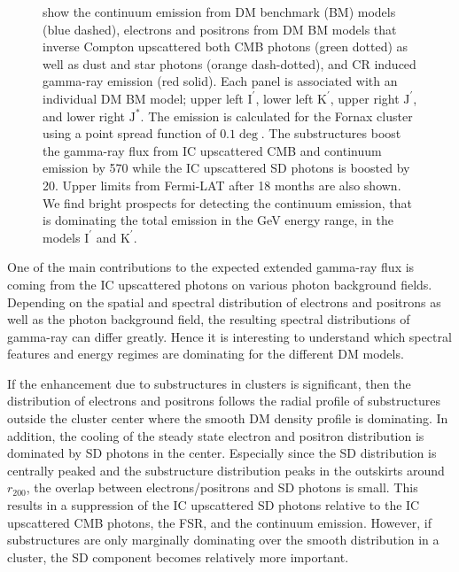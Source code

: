 \documentclass[10pt,aps,pra,reprint,amsmath,amsfonts,amssymb,showpacs,nofootinbib,floatfix]{revtex4-1}
\newcommand{\rmn}{\mathrm}
\newcommand{\Kp}{\rmn{K}^\prime}
\newcommand{\Ip}{\rmn{I}^\prime}
\newcommand{\Js}{\rmn{J}^*}
\newcommand{\Jp}{\rmn{J}^\prime}
\newcommand{\rvir}{r_{200}}
\begin{document}
\begin{figure}
\begin{minipage}{2.0\columnwidth}
{  show the continuum emission from DM benchmark (BM) models (blue
  dashed), electrons and positrons from DM BM models that inverse
  Compton upscattered both CMB photons (green dotted) as well as dust
  and star photons (orange dash-dotted), and CR induced gamma-ray
  emission (red solid). Each panel is associated with an individual DM
  BM model; upper left $\Ip$, lower left $\Kp$, upper right $\Jp$, and
  lower right $\Js$. The emission is calculated for the Fornax cluster
  using a point spread function of $0.1\deg$. The substructures boost
  the gamma-ray flux from IC upscattered CMB and continuum emission by
  570 while the IC upscattered SD photons is boosted by 20. Upper limits
from Fermi-LAT after 18 months 
 \protect \cite{2010ApJ...717L..71A} are also shown. We find
  bright prospects for detecting the continuum emission, that is
  dominating the total emission in the GeV energy range, in the models
  $\Ip$ and $\Kp$.}
 \label{fig:diff_BM}
\end{minipage}
\end{figure}


One of the main contributions to the expected extended gamma-ray flux
is coming from the IC upscattered photons on various photon background
fields. Depending on the spatial and spectral distribution of
electrons and positrons as well as the photon background field, the
resulting spectral distributions of gamma-ray can differ
greatly. Hence it is interesting to understand which spectral features
and energy regimes  are dominating for the different DM models.

If the enhancement due to substructures in clusters is significant,
then the distribution of electrons and positrons follows the radial
profile of substructures outside the cluster center where the smooth
DM density profile is dominating. In addition, the cooling of the
steady state electron and positron distribution is dominated by SD
photons in the center. Especially since the SD distribution is
centrally peaked and the substructure distribution peaks in the
outskirts around $\rvir$, the overlap between electrons/positrons and
SD photons is small. This results in a suppression of the IC
upscattered SD photons relative to the IC upscattered CMB photons, the
FSR, and the continuum emission. However, if substructures are only
marginally dominating over the smooth distribution in a cluster, the
SD component becomes relatively more important.
\end{document}
